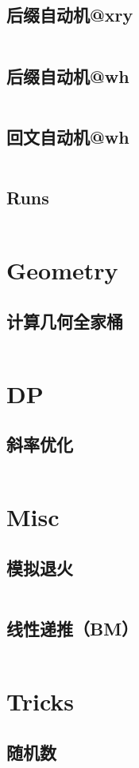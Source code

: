 \documentclass[titlepage, a4paper]{article}
\begin{document}
\begin{multicols}{2}
\begin{spacing}{0.6}
\subsection{后缀自动机@xry}
\inputminted{cpp}{tmp/String/后缀自动机@xry.cpp}
\subsection{后缀自动机@wh}
\inputminted{cpp}{tmp/String/后缀自动机@wh.cpp}
\subsection{回文自动机@wh}
\inputminted{cpp}{tmp/String/回文自动机@wh.cpp}
\subsection{Runs}
\inputminted{cpp}{tmp/String/Runs.cpp}
\section{Geometry}
\subsection{计算几何全家桶}
\inputminted{cpp}{tmp/Geometry/计算几何全家桶.cpp}
\section{DP}
\subsection{斜率优化}
\inputminted{cpp}{tmp/DP/斜率优化.cpp}
\section{Misc}
\subsection{模拟退火}
\inputminted{cpp}{tmp/Misc/模拟退火.cpp}
\subsection{线性递推（BM）}

\inputminted{cpp}{tmp/Misc/线性递推（BM）.cpp}
\section{Tricks}
\subsection{随机数}


\end{spacing}
\end{multicols}
\end{document}
